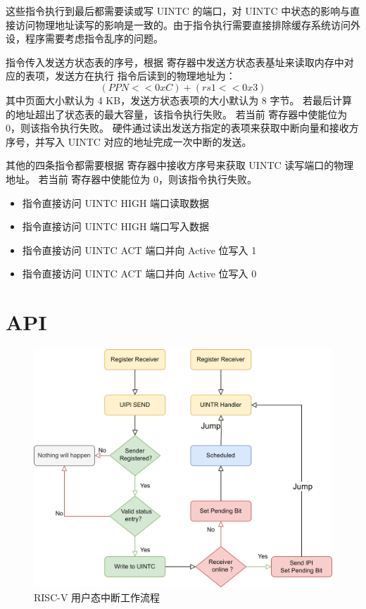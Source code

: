 这些指令执行到最后都需要读或写 UINTC 的端口，对 UINTC 中状态的影响与直接访问物理地址读写的影响是一致的。由于指令执行需要直接排除缓存系统访问外设，程序需要考虑指令乱序的问题。

\Iuipisend 指令传入发送方状态表的序号，根据 \Rsuist 寄存器中发送方状态表基址来读取内存中对应的表项，发送方在执行 \Iuipisend 指令后读到的物理地址为：
$$
( PPN << 0xC ) + ( rs1 << 0x3 )
$$
其中页面大小默认为 4 KB，发送方状态表项的大小默认为 8 字节。
若最后计算的地址超出了状态表的最大容量，该指令执行失败。
若当前 \Rsuist 寄存器中使能位为 0，则该指令执行失败。
硬件通过读出发送方指定的表项来获取中断向量和接收方序号，并写入 UINTC 对应的地址完成一次中断的发送。

其他的四条指令都需要根据 \Rsuirs 寄存器中接收方序号来获取 UINTC 读写端口的物理地址。
若当前 \Rsuirs 寄存器中使能位为 0，则该指令执行失败。

\begin{itemize}
    \item \Iuipiread 指令直接访问 UINTC HIGH 端口读取数据
    \item \Iuipiwrite 指令直接访问 UINTC HIGH 端口写入数据
    \item \Iuipiact 指令直接访问 UINTC ACT 端口并向 Active 位写入 1
    \item \Iuipideact 指令直接访问 UINTC ACT 端口并向 Active 位写入 0
\end{itemize}

\section{API}

\begin{figure}
    \centering
    \includegraphics[width=0.8\linewidth]{figures/uintr2.png}
    \caption{RISC-V 用户态中断工作流程}
    \label{fig:uintr2}
\end{figure}

